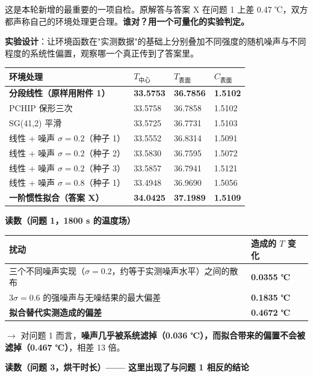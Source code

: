 这是本轮新增的最重要的一项自检。原解答与答案 X 在问题 1 上差 0.47 ℃，双方都声称自己的环境处理更合理。\textbf{谁对？用一个可量化的实验判定。}


\textbf{实验设计}：让环境函数在"实测数据"的基础上分别叠加不同强度的随机噪声与不同程度的系统性偏置，观察哪一个真正传到了答案里。


\begin{center}
\small
\begin{tabular}{llll}
\toprule
环境处理 & $T_{中心}$ & $T_{表面}$ & $C_{表面}$ \\
\midrule
\textbf{分段线性（原样用附件 1）} & \textbf{33.5753} & \textbf{36.7856} & \textbf{1.5102} \\
PCHIP 保形三次 & 33.5758 & 36.7858 & 1.5102 \\
SG(41,2) 平滑 & 33.5725 & 36.7731 & 1.5103 \\
线性 + 噪声 $\sigma=0.2$（种子 1） & 33.5552 & 36.8314 & 1.5091 \\
线性 + 噪声 $\sigma=0.2$（种子 2） & 33.5830 & 36.7595 & 1.5072 \\
线性 + 噪声 $\sigma=0.2$（种子 3） & 33.5857 & 36.7941 & 1.5121 \\
线性 + 噪声 $\sigma=0.8$（种子 1） & 33.4948 & 36.9690 & 1.5056 \\
\textbf{一阶惯性拟合（答案 X）} & \textbf{34.0425} & \textbf{37.1989} & \textbf{1.5109} \\
\bottomrule
\end{tabular}
\end{center}


\textbf{读数（问题 1，1800 s 的温度场）}


\begin{center}
\small
\begin{tabular}{ll}
\toprule
扰动 & 造成的 $T$ 变化 \\
\midrule
三个不同噪声实现（$\sigma=0.2$，约等于实测噪声水平）之间的散布 & \textbf{0.0355 ℃} \\
$3\sigma=0.6$ 的强噪声与无噪结果的最大偏差 & \textbf{0.1835 ℃} \\
\textbf{拟合替代实测造成的偏差} & \textbf{0.4672 ℃} \\
\bottomrule
\end{tabular}
\end{center}


$\rightarrow$ 对问题 1 而言，\textbf{噪声几乎被系统滤掉（0.036 ℃），而拟合带来的偏置不会被滤掉（0.467 ℃）}，相差 13 倍。


\textbf{读数（问题 3，烘干时长）—— 这里出现了与问题 1 相反的结论}


